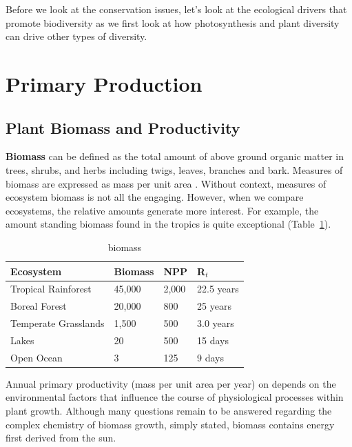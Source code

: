 Before we look at the conservation issues, let's look at the ecological drivers that promote biodiversity as we first look at how photosynthesis and plant diversity can drive other types of diversity. 

\section{Primary Production}

\subsection{Plant Biomass and Productivity}

  \textbf{Biomass} can be defined as the total amount of above ground organic matter in trees, shrubs, and herbs including twigs, leaves, branches and bark. Measures of biomass are expressed as mass per unit area \citep{brown1991biomass}. Without context, measures of ecosystem biomass is not all the engaging. However, when we compare ecosystems, the relative amounts generate more interest. For example, the amount standing biomass found in the tropics is quite exceptional (Table~\ref{tab:biomass}). 

\begin{table}[htb]
\centering
		\begin{tabular}{llll}\hline
Ecosystem 						& Biomass	& NPP		& R$_t$ \\ \hline\hline

Tropical Rainforest		& 45,000	& 2,000	& 22.5 years \\
Boreal Forest					& 20,000	& 800		& 25 years \\
Temperate Grasslands	& 1,500		& 500		& 3.0 years \\
Lakes									& 20			& 500		& 15 days\\
Open Ocean						& 3				& 125		& 9 days \\ \hline

			
		\end{tabular}
	\caption{biomass}
	\label{tab:biomass}
\end{table}
	

	
Annual primary productivity (mass per unit area per year) on depends on the environmental factors that influence the course of physiological processes within plant growth. Although many questions remain to be answered regarding the complex chemistry of biomass growth, simply stated, biomass contains energy first derived from the sun. 

